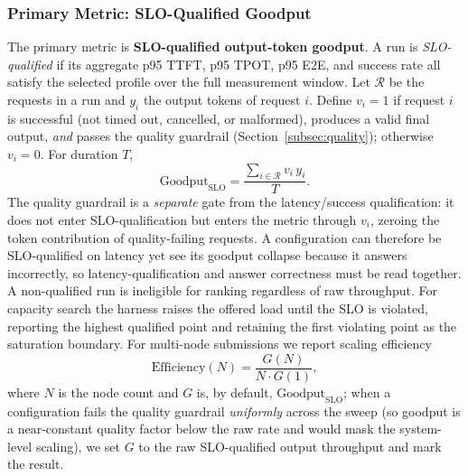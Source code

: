 \subsubsection{Primary Metric: SLO-Qualified Goodput}
\label{subsec:goodput}
The primary metric is \textbf{SLO-qualified output-token goodput}. A run is
\emph{SLO-qualified} if its aggregate p95 TTFT, p95 TPOT, p95 E2E, and success rate
all satisfy the selected profile over the full measurement window. Let
$\mathcal{R}$ be the requests in a run and $y_i$ the output tokens of request $i$.
Define $v_i{=}1$ if request $i$ is successful (not timed out, cancelled, or
malformed), produces a valid final output, \emph{and} passes the quality guardrail
(Section~\ref{subsec:quality}); otherwise $v_i{=}0$. For duration $T$,
\begin{equation}
\mathrm{Goodput}_{\mathrm{SLO}}
= \frac{\sum_{i \in \mathcal{R}} v_i\, y_i}{T}.
\label{eq:goodput}
\end{equation}
The quality guardrail is a \emph{separate} gate from the latency/success
qualification: it does not enter SLO-qualification but enters the metric through
$v_i$, zeroing the token contribution of quality-failing requests. A configuration
can therefore be SLO-qualified on latency yet see its goodput collapse because it
answers incorrectly, so latency-qualification and answer correctness must be read
together. A non-qualified run is ineligible for ranking regardless of raw
throughput. For capacity search the harness raises the offered load until the SLO
is violated, reporting the highest qualified point and retaining the first
violating point as the saturation boundary. For multi-node submissions we report
scaling efficiency
\begin{equation}
\mathrm{Efficiency}(N) = \frac{G(N)}{N \cdot G(1)},
\label{eq:efficiency}
\end{equation}
where $N$ is the node count and $G$ is, by default, $\mathrm{Goodput}_{\mathrm{SLO}}$;
when a configuration fails the quality guardrail \emph{uniformly} across the sweep
(so goodput is a near-constant quality factor below the raw rate and would mask the
system-level scaling), we set $G$ to the raw SLO-qualified output throughput and
mark the result.

